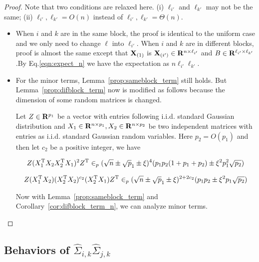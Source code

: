 \begin{proof}
Note that two conditions are relaxed here. (i) $\ell_{i'}$ and $\ell_{k'}$ may not be the same; (ii) $\ell_{i'},\ell_{k'} = O(n)$ instead of $\ell_{i'},\ell_{k'} = \Theta(n)$.

\begin{itemize}
    \item {}
    When $i$ and $k$ are in the same block, the proof is identical to the uniform case and we only need to change $\ell$ into $\ell_{i'}$.
    When $i$ and $k$ are in different blocks, proof is almost the same except that $\mathbf{X}_{(1)}$ is $\mathbf{X}_{(i')} \in \mathbf{R}^{n \times \ell_{i'}}$ and $B \in  \mathbf{R}^{\ell_{i'}\times \ell_{k'}}$.By Eq.\ref{eqn:expect_n} we have the expectation as $n \ell_{i'}\ell_{k'}$.
    \item {}
    For the minor terms, Lemma~\ref{prop:sameblock_term} still holds. But Lemma~\ref{prop:difblock_term} now is modified as follows because the dimension of some random matrices is changed.
  
\begin{corollary} \label{cor:difblock_term_n}
Let $Z \in \mathbf{R}^{p_1}$ be a vector with entries following i.i.d. standard Gaussian distribution and $X_1 \in \mathbf{R}^{n\times p_1}, X_2 \in \mathbf{R}^{n\times p_2}$ be two independent matrices with entries as i.i.d. standard Gaussian random variables. Here $p_2 = O(p_1)$ and then let $c_2$ be a positive integer, we have

\begin{equation}
    Z(X_1^{\mathrm{T}}X_2X_2^{\mathrm{T}}X_1)^{2} Z^{\mathrm{T}}
    \in_p (\sqrt n \pm \sqrt p_1 \pm \xi)^{4}(p_1 p_2(1+p_1+p_2) \pm \xi^2 p_1^2 \sqrt{p_2})
\end{equation}

\begin{equation}
    Z(X_1^{\mathrm{T}}X_2)(X_2^{\mathrm{T}}X_2)^{c_2}(X_2^{\mathrm{T}}X_1) Z^{\mathrm{T}}
    \in_p (\sqrt n \pm \sqrt p_1 \pm \xi)^{2+2c_2}(p_1p_2 \pm \xi^2 p_1\sqrt{p_2})
\end{equation}
\end{corollary}
    Now with Lemma~\ref{prop:sameblock_term} and Corollary~\ref{cor:difblock_term_n}, we can analyze minor terms.
\end{itemize}
\end{proof}

\subsection{Behaviors of $\hat \Sigma_{i,k} \hat \Sigma_{j,k}$}

